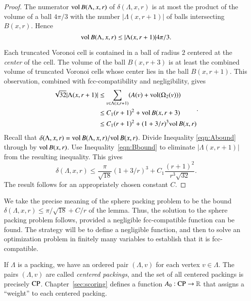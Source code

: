 \begin{proof}
The numerator ${\operatorname{vol}}\, B(\Lambda,x,r)$ of $\delta(\Lambda,x,r)$
is at most the product of the volume of a ball $4\pi/3$ with the
number $|\Lambda(x,r+1)|$ of balls intersecting $B(x,r)$.  Hence
    \begin{equation}
    {\operatorname{vol}}\, B(\Lambda,x,r) \le |\Lambda(x,r+1)| 4\pi/3.
    \label{eqn:Abound}
    \end{equation}

Each truncated Voronoi cell is contained in a ball of
radius $2$ centered at the {\it center} of the cell.  The volume
of the ball $B(x,r+3)$ is at least the combined volume of 
truncated Voronoi
cells whose center lies in the ball $B(x,r+1)$. This observation,
combined with fcc-compatibility and negligibility, gives
    \begin{equation}
    \begin{split}
    \sqrt{32}|\Lambda(x,r+1)|
    &\le \sum_{v\in\Lambda(x,r+1)} (A(v) +
    {\operatorname{vol}}(\Omega_2(v))) \\
    &\le C_1 (r+1)^2 + {\operatorname{vol}}\,B(x,r+3) \\
    &\le C_1 (r+1)^2 + (1+3/r)^3 {\operatorname{vol}}\,B(x,r)
    \label{eqn:Bbound}
    \end{split}.
    \end{equation}
Recall that $\delta(\Lambda,x,r)=
{\operatorname{vol}}\,B(\Lambda,x,r)/{\operatorname{vol}}\,B(x,r)$. Divide Inequality
\ref{eqn:Abound} through by ${\operatorname{vol}}\,B(x,r)$.  Use
Inequality~\ref{eqn:Bbound} to eliminate $|\Lambda(x,r+1)|$ from the
resulting inequality.  This gives
    $$\delta(\Lambda,x,r)
        \le \frac{\pi}{\sqrt{18}} (1+3/r)^3 + C_1 \frac{(r+1)^2}{r^3\sqrt{32}}.
    $$
The result follows for an appropriately chosen constant $C$.
\end{proof}

\begin{remark} \label{remark:precise}
We take the precise meaning of the sphere packing problem to be the
bound $\delta(\Lambda,x,r) \le \pi/\sqrt{18} + C/r$ of the lemma.
Thus, the solution to the sphere packing problem follows, provided a negligible
fcc-compatible function can be found. The strategy will be to
define a negligible function, and then to solve an optimization
problem in finitely many variables to establish that it is
fcc-compatible.
\end{remark}

If $\Lambda$ is a %
packing, we have an ordered pair
$(\Lambda,v)$ for each vertex $v\in\Lambda$.  The pairs
$(\Lambda,v)$ are called {\it centered packings}, and the
set of all centered packings is precisely ${\operatorname{CP}}$.
%
Chapter~\ref{sec:scoring} defines a function
$A_0:{\operatorname{CP}}\to\mathbb{R}$ that assigns a ``weight'' to each
centered packing.


